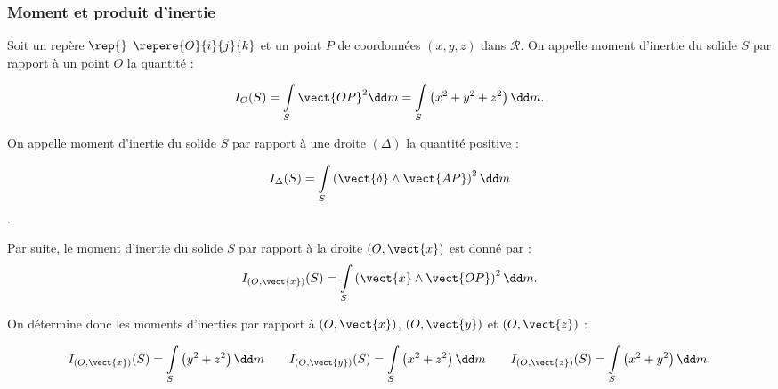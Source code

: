 \subsubsection{Moment et produit d'inertie}
\begin{defi}
Soit un repère $\rep{}$ $\repere{O}{i}{j}{k}$ et un point $P$ de coordonnées $\left(x,y,z\right)$ dans $\mathcal{R}$.  
On appelle moment d'inertie du solide $S$ par rapport à un point $O$ la quantité :

$$ I_O(S)=\int\limits_S \vect{OP}^2 \dd m = \int\limits_S \left( x^2 + y^2 + z^2 \right) \dd m.  $$

\end{defi}

\begin{defi}
On appelle moment d'inertie du solide $S$ par rapport à une droite $\left(\Delta\right)$ la quantité positive :

$$ I_{\Delta}(S)=\int\limits_S \left( \vect{\delta} \wedge \vect{AP}\right)^2 \dd m  $$.

Par suite, le moment d'inertie du solide $S$ par rapport à la droite $\left(O,\vect{x}\right)$ est donné par : 
$$ I_{\left(O,\vect{x}\right)}(S)=\int\limits_S \left( \vect{x} \wedge \vect{OP}\right)^2 \dd m.  $$

On détermine donc les moments d'inerties par rapport à $\left(O,\vect{x}\right)$, $\left(O,\vect{y}\right)$ et $\left(O,\vect{z}\right)$ :

$$ I_{\left(O,\vect{x}\right)}(S) =\int\limits_S \left(y^2 + z^2\right) \dd m\quad \quad
I_{\left(O,\vect{y}\right)}(S)     =\int\limits_S \left(x^2 + z^2\right) \dd m\quad \quad
I_{\left(O,\vect{z}\right)}(S)     =\int\limits_S \left(x^2 + y^2\right)\dd m.
$$



\end{defi}

%



